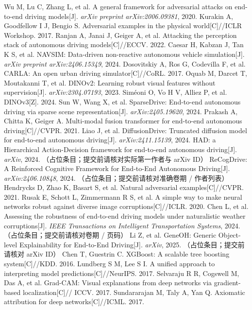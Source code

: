 \documentclass[a4paper,12pt,fontset=fandol]{ctexart}
\begin{document}
{\begin{enumerate}[leftmargin=2em]
 Wu M, Lu C, Zhang L, et al. A general framework for adversarial
      attacks on end-to-end driving models[J]. \emph{arXiv preprint arXiv:2006.09381}, 2020.
 Kurakin A, Goodfellow I J, Bengio S. Adversarial examples
      in the physical world[C]//ICLR Workshop. 2017.
 Ranjan A, Janai J, Geiger A, et al. Attacking the perception
      stack of autonomous driving models[C]//ECCV. 2022.
 Caesar H, Kabzan J, Tan K S, et al. NAVSIM: Data-driven
      non-reactive autonomous vehicle simulation[J]. \emph{arXiv preprint
      arXiv:2406.15349}, 2024.
 Dosovitskiy A, Ros G, Codevilla F, et al. CARLA: An open urban
      driving simulator[C]//CoRL. 2017.
 Oquab M, Darcet T, Moutakanni T, et al. DINOv2: Learning robust
      visual features without supervision[J]. \emph{arXiv:2304.07193}, 2023.
 Siméoni O, Vo H V, Alliez P, et al. DINOv3[Z]. 2024.
 Sun W, Wang X, et al. SparseDrive: End-to-end autonomous
      driving via sparse scene representation[J]. \emph{arXiv:2405.19620}, 2024.
 Prakash A, Chitta K, Geiger A. Multi-modal fusion
      transformer for end-to-end autonomous driving[C]//CVPR. 2021.
 Liao J, et al. DiffusionDrive: Truncated diffusion
      model for end-to-end autonomous driving[J]. \emph{arXiv:2411.15139}, 2024.
 HAD: a Hierarchical Action-Decision framework for
      end-to-end autonomous driving[J]. \emph{arXiv}, 2024.
      （占位条目；提交前请核对实际第一作者与 arXiv ID）
 ReCogDrive: A Reinforced Cognitive Framework
      for End-to-End Autonomous Driving[J]. \emph{arXiv:2406.10848}, 2024.
      （占位条目；提交前请核对准确卷期 / 作者列表）
 Hendrycks D, Zhao K, Basart S, et al. Natural adversarial
      examples[C]//CVPR. 2021.
 Rusak E, Schott L, Zimmermann R S, et al. A simple way to make
      neural networks robust against diverse image corruptions[C]//ICLR. 2020.
 Chen L, et al. Assessing the robustness of
      end-to-end driving models under naturalistic weather corruptions[J].
      \emph{IEEE Transactions on Intelligent Transportation Systems}, 2024.
      （占位条目；提交前请核对卷期 / 页码）
 Li Z, et al. GeneOH: Generic Object-level
      Explainability for End-to-End Driving[J]. \emph{arXiv}, 2025.
      （占位条目；提交前请核对 arXiv ID）
 Chen T, Guestrin C. XGBoost: A scalable tree boosting
      system[C]//KDD. 2016.
 Lundberg S M, Lee S I. A unified approach to interpreting model
      predictions[C]//NeurIPS. 2017.
 Selvaraju R R, Cogswell M, Das A, et al. Grad-CAM: Visual
      explanations from deep networks via gradient-based localization[C]//
      ICCV. 2017.
 Sundararajan M, Taly A, Yan Q. Axiomatic attribution for deep
      networks[C]//ICML. 2017.
\end{enumerate}

}
\end{document}
